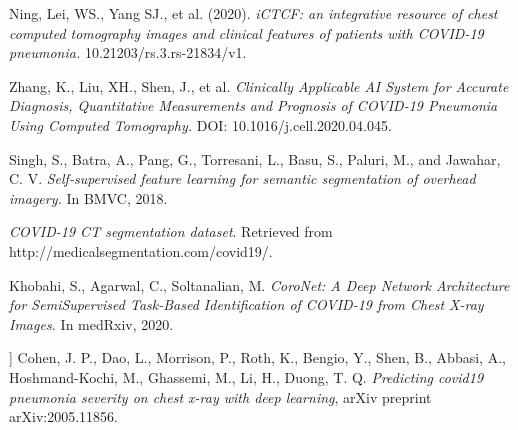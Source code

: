 \begin{thebibliography}{1}
	 Ning, Lei, WS., Yang SJ., et al. (2020). \textit{iCTCF: an integrative resource of chest computed tomography images and clinical features of patients with COVID-19 pneumonia.} 10.21203/rs.3.rs-21834/v1.

	 Zhang, K., Liu, XH., Shen, J., et al. \textit{Clinically Applicable AI System for Accurate Diagnosis, Quantitative Measurements and Prognosis of COVID-19 Pneumonia Using Computed Tomography.} DOI: 10.1016/j.cell.2020.04.045.
	
	  Singh, S., Batra, A., Pang, G., Torresani, L., Basu, S.,  Paluri, M., and Jawahar, C. V.  \textit{Self-supervised feature learning for semantic segmentation of
	overhead imagery.} In BMVC, 2018.

	 \textit{COVID-19 CT segmentation dataset}. Retrieved from http://medicalsegmentation.com/covid19/.
	
	 Khobahi, S., Agarwal, C., Soltanalian, M. \textit{CoroNet: A Deep Network Architecture for
		SemiSupervised Task-Based Identification of COVID-19 from Chest X-ray Images.} In medRxiv, 2020.
	
	 ] Cohen, J. P., Dao, L., Morrison, P., Roth, K., Bengio, Y., Shen, B., Abbasi, A., Hoshmand-Kochi, M., Ghassemi, M., Li, H., Duong, T. Q. \textit{Predicting covid19 pneumonia severity on chest x-ray with deep learning}, arXiv preprint arXiv:2005.11856.

\end{thebibliography}
